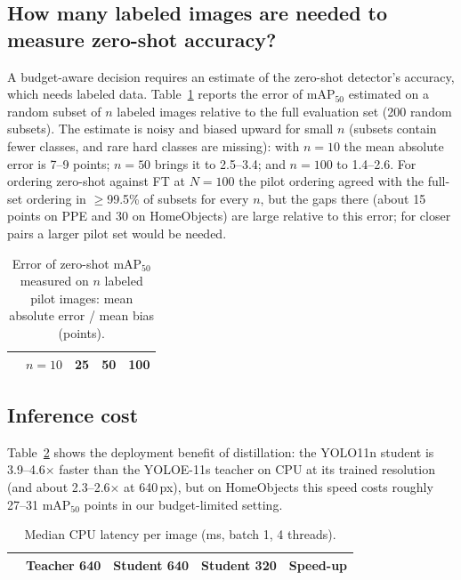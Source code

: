 \subsection{How many labeled images are needed to measure zero-shot accuracy?}
A budget-aware decision requires an estimate of the zero-shot detector's accuracy, which needs labeled data. Table~\ref{tab:pilot} reports the error of mAP$_{50}$ estimated on a random subset of $n$ labeled images relative to the full evaluation set (200 random subsets). The estimate is noisy and biased upward for small $n$ (subsets contain fewer classes, and rare hard classes are missing): with $n{=}10$ the mean absolute error is 7--9 points; $n{=}50$ brings it to 2.5--3.4; and $n{=}100$ to 1.4--2.6. For ordering zero-shot against FT at $N{=}100$ the pilot ordering agreed with the full-set ordering in $\ge$99.5\% of subsets for every $n$, but the gaps there (about 15 points on PPE and 30 on HomeObjects) are large relative to this error; for closer pairs a larger pilot set would be needed.

\begin{table}[t]
\caption{Error of zero-shot mAP$_{50}$ measured on $n$ labeled pilot images: mean absolute error / mean bias (points).}
\label{tab:pilot}
\centering\footnotesize
\begin{tabular}{lcccc}
\toprule
 & $n{=}10$ & 25 & 50 & 100\\
\midrule

\bottomrule
\end{tabular}
\end{table}

\subsection{Inference cost}
Table~\ref{tab:speed} shows the deployment benefit of distillation: the YOLO11n student is 3.9--4.6$\times$ faster than the YOLOE-11s teacher on CPU at its trained resolution (and about 2.3--2.6$\times$ at 640\,px), but on HomeObjects this speed costs roughly 27--31 mAP$_{50}$ points in our budget-limited setting.

\begin{table}[t]
\caption{Median CPU latency per image (ms, batch 1, 4 threads).}
\label{tab:speed}
\centering\footnotesize
\begin{tabular}{lcccc}
\toprule
 & Teacher 640 & Student 640 & Student 320 & Speed-up\\
\midrule

\bottomrule
\end{tabular}
\end{table}

